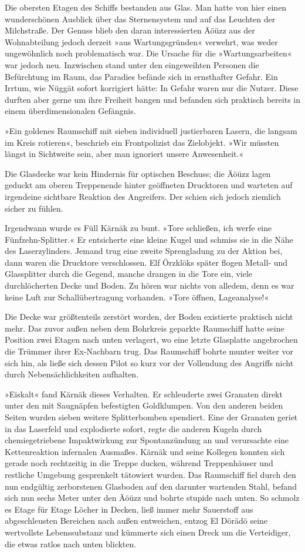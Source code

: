 Die obersten Etagen des Schiffs bestanden aus Glas. Man hatte von hier einen wunderschönen Ausblick über das Sternensystem und auf das Leuchten der Milchstraße. Der Genuss blieb den daran interessierten Äöüzz aus der Wohnabteilung jedoch derzeit »aus Wartungsgründen« verwehrt, was weder ungewöhnlich noch problematisch war. Die Ursache für die »Wartungsarbeiten« war jedoch neu. Inzwischen stand unter den eingeweihten Personen die Befürchtung im Raum, das Paradies befände sich in ernsthafter Gefahr. Ein Irrtum, wie Nüggät sofort korrigiert hätte: In Gefahr waren nur die Nutzer. Diese durften aber gerne um ihre Freiheit bangen und befanden sich praktisch bereits in einem überdimensionalen Gefängnis.

»Ein goldenes Raumschiff mit sieben individuell justierbaren Lasern, die langsam im Kreis rotieren«, beschrieb ein Frontpolizist das Zielobjekt. »Wir müssten längst in Sichtweite sein, aber man ignoriert unsere Anwesenheit.«

Die Glasdecke war kein Hindernis für optischen Beschuss; die Äöüzz lagen geduckt am oberen Treppenende hinter geöffneten Drucktoren und warteten auf irgendeine sichtbare Reaktion des Angreifers. Der schien sich jedoch ziemlich sicher zu fühlen.

Irgendwann wurde es Füll Kärnäk zu bunt. »Tore schließen, ich werfe eine Fünfzehn-Splitter.« Er entsicherte eine kleine Kugel und schmiss sie in die Nähe des Laserzylinders. Jemand trug eine zweite Sprengladung zu der Aktion bei, dann waren die Drucktore verschlossen. Elf Örzklöks später flogen Metall- und Glassplitter durch die Gegend, manche drangen in die Tore ein, viele durchlöcherten Decke und Boden. Zu hören war nichts von alledem, denn es war keine Luft zur Schallübertragung vorhanden. »Tore öffnen, Lageanalyse!«

Die Decke war größtenteils zerstört worden, der Boden existierte praktisch nicht mehr. Das zuvor außen neben dem Bohrkreis geparkte Raumschiff hatte seine Position zwei Etagen nach unten verlagert, wo eine letzte Glasplatte angebrochen die Trümmer ihrer Ex-Nachbarn trug. Das Raumschiff bohrte munter weiter vor sich hin, als ließe sich dessen Pilot so kurz vor der Vollendung des Angriffs nicht durch Nebensächlichkeiten aufhalten.

»Eiskalt« fand Kärnäk dieses Verhalten. Er schleuderte zwei Granaten direkt unter den mit Saugnäpfen befestigten Goldklumpen. Von den anderen beiden Seiten wurden sieben weitere Splitterbomben spendiert. Eine der Granaten geriet in das Laserfeld und explodierte sofort, regte die anderen Kugeln durch chemiegetriebene Impaktwirkung zur Spontanzündung an und verursachte eine Kettenreaktion infernalen Ausmaßes. Kärnäk und seine Kollegen konnten sich gerade noch rechtzeitig in die Treppe ducken, während Treppenhäuser und restliche Umgebung gesprenkelt tätowiert wurden. Das Raumschiff fiel durch den nun endgültig zerborstenen Glasboden auf den darunter wartenden Stahl, befand sich nun sechs Meter unter den Äöüzz und bohrte stupide nach unten. So schmolz es Etage für Etage Löcher in Decken, ließ immer mehr Sauerstoff aus abgeschleusten Bereichen nach außen entweichen, entzog El Dörädö seine wertvollste Lebenssubstanz und kümmerte sich einen Dreck um die Verteidiger, die etwas ratlos nach unten blickten.

